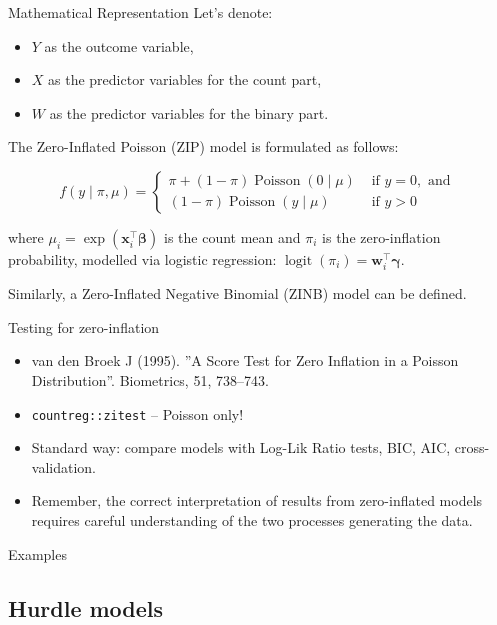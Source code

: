 \documentclass[10pt,ignorenonframetext,aspectratio=169]{beamer}
\begin{document}
\begin{frame}{Mathematical Representation}
Let's denote:
\begin{itemize}
\item $Y$ as the outcome variable,
\item $X$ as the predictor variables for the count part,
\item $W$ as the predictor variables for the binary part.
\end{itemize}
The Zero-Inflated Poisson (ZIP) model is formulated as follows:

$$
f\left(y \mid \pi, \mu\right)=\left\{\begin{array}{ll}\pi+(1-\pi) \operatorname{Poisson}(0 \mid \mu) & \text { if } y =0, \text { and } \\ (1-\pi)  \operatorname{Poisson}\left(y  \mid \mu\right) & \text { if } y >0\end{array}\right.
$$

where $\mu_i = \exp(\mathbf{x}_i^\top \boldsymbol{\beta})$ is the count mean and $\pi_i$ is the zero-inflation probability, modelled via logistic regression: $\operatorname{logit}(\pi_i) = \mathbf{w}_i^\top \boldsymbol{\gamma}$.

Similarly, a Zero-Inflated Negative Binomial (ZINB) model can be defined.
\end{frame}

\begin{frame}{Testing for zero-inflation}
\begin{itemize}
    \item van den Broek J (1995). ''A Score Test for Zero Inflation in a Poisson Distribution''. Biometrics, 51, 738–743.
    \item \texttt{countreg::zitest} -- Poisson only!
    \item Standard way: compare models with Log-Lik Ratio tests, BIC, AIC, cross-validation.
    \item Remember, the correct interpretation of results from zero-inflated models requires careful understanding of the two processes generating the data.
\end{itemize}
\end{frame}


\begin{frame}{Examples}

\end{frame}

\subsection{Hurdle models}
\end{document}
